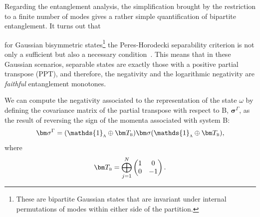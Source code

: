 \documentclass[letterpaper,12pt,titlepage,oneside,final]{book}
\newcommand{\openone}{\mathds{1}}
\newcommand{\trr}[1]{\textcolor{red}{#1}}
\begin{document}
Regarding the entanglement analysis, the simplification brought by the restriction to a finite number of modes gives a rather simple quantification of bipartite entanglement. It turns out that {\color{black} for Gaussian bisymmetric states\footnote{These are bipartite Gaussian states that are invariant under internal permutations of modes within either side of the partition.} %
the Peres-Horodecki separability criterion is not only a sufficient but also a necessary condition~\cite{Simon2000, Serafini2005}. This means that in these Gaussian scenarios, separable states are exactly those with a positive partial transpose (PPT), and therefore, the negativity and the logarithmic negativity are \textit{faithful} entanglement monotones. %


We can compute the negativity associated to the representation of the state $\omega$ by defining the covariance matrix of the partial transpose with respect to B, $\bm\sigma^\Gamma$, as the result of reversing the sign of the momenta associated with system B: 
\begin{equation}
\bm\sigma^\Gamma = (\openone_{\textsc a} \oplus \bm T_\textsc{b}) \bm\sigma (\openone_{\textsc a} \oplus \bm T_\textsc{b}), 
\end{equation}
where
\begin{equation}
\bm T_\textsc{b} = \bigoplus_{j=1}^{N}\begin{pmatrix}
    1 & 0 \\
    0 & -1
\end{pmatrix}.
\end{equation}}
\end{document}
